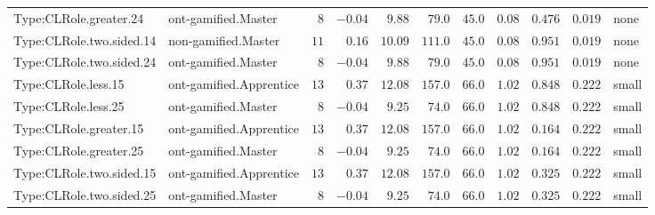 \documentclass[6pt,a4paper]{article}
\begin{document}
{\begin{longtable}{llrrrrrrrrl}
Type:CLRole.greater.24&ont-gamified.Master&$ 8$&$-0.04$&$ 9.88$&$ 79.0$&$ 45.0$&$ 0.08$&$0.476$&$0.019$&none\tabularnewline
Type:CLRole.two.sided.14&non-gamified.Master&$11$&$ 0.16$&$10.09$&$111.0$&$ 45.0$&$ 0.08$&$0.951$&$0.019$&none\tabularnewline
Type:CLRole.two.sided.24&ont-gamified.Master&$ 8$&$-0.04$&$ 9.88$&$ 79.0$&$ 45.0$&$ 0.08$&$0.951$&$0.019$&none\tabularnewline
Type:CLRole.less.15&ont-gamified.Apprentice&$13$&$ 0.37$&$12.08$&$157.0$&$ 66.0$&$ 1.02$&$0.848$&$0.222$&small\tabularnewline
Type:CLRole.less.25&ont-gamified.Master&$ 8$&$-0.04$&$ 9.25$&$ 74.0$&$ 66.0$&$ 1.02$&$0.848$&$0.222$&small\tabularnewline
Type:CLRole.greater.15&ont-gamified.Apprentice&$13$&$ 0.37$&$12.08$&$157.0$&$ 66.0$&$ 1.02$&$0.164$&$0.222$&small\tabularnewline
Type:CLRole.greater.25&ont-gamified.Master&$ 8$&$-0.04$&$ 9.25$&$ 74.0$&$ 66.0$&$ 1.02$&$0.164$&$0.222$&small\tabularnewline
\newpage
Type:CLRole.two.sided.15&ont-gamified.Apprentice&$13$&$ 0.37$&$12.08$&$157.0$&$ 66.0$&$ 1.02$&$0.325$&$0.222$&small\tabularnewline
Type:CLRole.two.sided.25&ont-gamified.Master&$ 8$&$-0.04$&$ 9.25$&$ 74.0$&$ 66.0$&$ 1.02$&$0.325$&$0.222$&small\tabularnewline
\hline
\end{longtable}}
\end{document}
